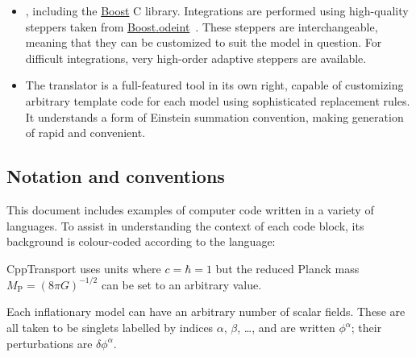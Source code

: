 \documentclass[11pt,a4paper]{article}
\newcommand{\Mp}{M_{\mathrm{P}}}
\newcommand{\packagefont}{\sffamily}
\newcommand{\CppTransport}{{\packagefont CppTransport}}
\newcommand{\Boost}{{\packagefont Boost}}
\newcommand{\odeint}{{\packagefont odeint}}
\newcommand{\CMake}{{\packagefont CMake}}
\newcommand{\semibold}[1]{{\fontseries{b}\selectfont{#1}}}
\newcommand\CC{C\nolinebreak\hspace{-.05em}\raisebox{.4ex}{\relsize{-3}{\textbf{+}}}\nolinebreak\hspace{-.10em}\raisebox{.4ex}{\relsize{-3}{\textbf{+}}}}
\begin{document}
\begin{itemize}
    \item \semibold{Leverages standard libraries},
    including the \href{http://www.boost.org}{\Boost} {\CC} library.
    Integrations are performed using high-quality
    steppers taken from
    \href{http://www.boost.org/doc/libs/release/libs/numeric/odeint}{{\Boost}.{\odeint}}~\cite{2011AIPC.1389.1586A}.
    These steppers are interchangeable, meaning that they can be customized
    to suit the model in question.
    For difficult integrations, very high-order adaptive steppers
    are available.
    
    \item The translator is a full-featured tool in its own right,
    capable of customizing arbitrary template code
    for each model using sophisticated replacement rules.
    It understands a form of Einstein summation convention,
    making generation of \semibold{specialized template code}
    rapid and convenient.
\end{itemize}

\subsection{Notation and conventions}
This document includes examples of computer code written in a variety
of languages.
To assist in understanding the context of each code block, its background
is colour-coded according to the language:
{\CppTransport} uses units where $c=\hbar=1$ but the
reduced Planck mass $\Mp = (8\pi G)^{-1/2}$
can be set to an arbitrary value.

Each inflationary model can have an arbitrary number of scalar fields. These are
all taken to be singlets
labelled by indices $\alpha$, $\beta$, \dots,
and are written $\phi^\alpha$; their perturbations are $\delta\phi^\alpha$.
\end{document}
